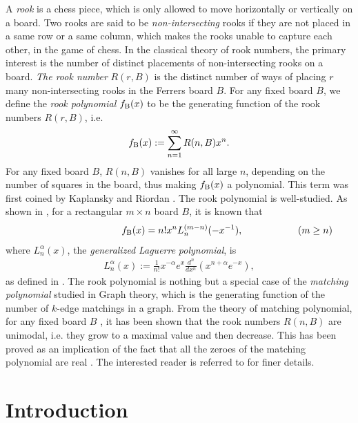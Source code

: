 \documentclass[12pt,reqno]{amsart}
\numberwithin{equation}{section}
\theoremstyle{plain}
\begin{document}
	A  \emph{rook} is a chess piece, which is only allowed to move horizontally or vertically on a board. Two rooks are said to be \emph{non-intersecting} rooks if they are not placed in a same row or a same column, which makes the rooks unable to capture each other, in the game of chess.  In the classical theory of rook numbers, the primary interest is the number of distinct placements of non-intersecting rooks on a board. \emph{The rook number} $R(r,B)$ is the distinct number of ways of placing $r$ many non-intersecting rooks in the Ferrers board $B$. For any fixed board $B$, we define the \textit{rook polynomial} $f_{\textup{B}}(x)$ to be the generating function of the rook numbers $R(r,B)$, i.e.
	\begin{align*}
		f_{\textup{B}}(x):= \sum_{n=1}^{\infty} R(n,B) x^n.
	\end{align*}
	For any fixed board $B$, $R(n,B)$ vanishes for all large $n$, depending on the number of squares in the board, thus making $f_{\textup{B}}(x)$ a polynomial. This term was first coined by Kaplansky and Riordan \cite{KapRio}. The rook polynomial is well-studied. As shown in \cite[Chapter 7]{Riordan}, for a rectangular $m \times n$ board $B$, it is known that
	\begin{align*}
	\hspace{3.5 cm} 	f_{\textup{B}}(x) = n! x^n L_n^{(m-n)}(-x^{-1}), \hspace{2 cm} (m\geq n)
	\end{align*}
	where $L_n^{\alpha}(x)$, the \textit{generalized} \emph{Laguerre} \textit{polynomial}, is
	\begin{align*}
		L_n^{\alpha} (x):= \frac{1}{n!} x^{-\alpha} e^{x} \frac{d^n}{dx^n} \left( x^{n+\alpha} e^{-x} \right),
	\end{align*}
	as defined in \cite[Equation (6.23)]{temme}. The rook polynomial is nothing but a special case of the \emph{matching polynomial} studied in Graph theory, which is the generating function of the number of $k$-edge matchings in a graph. From the theory of matching polynomial, for any fixed board $B$ , it has been shown that the rook numbers $R(n,B)$ are unimodal, i.e. they grow to a maximal value and then decrease. This has been proved as an implication of the fact that all the zeroes of the matching polynomial are real \cite[Section 4]{HL}. The interested reader is referred to \cite[Chapter 2]{BHR} for finer details.

	\section{Introduction}
\end{document}
